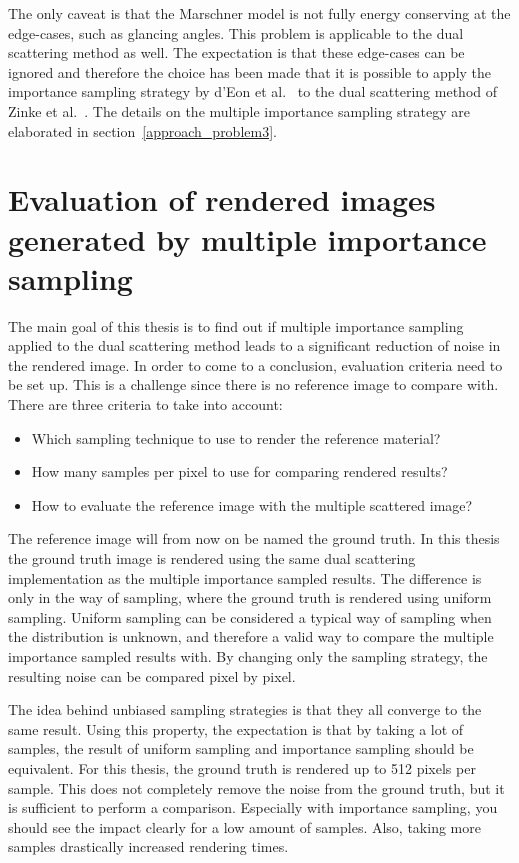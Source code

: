 \documentclass[11pt,a4paper]{report}
\begin{document}
The only caveat is that the Marschner model is not fully energy conserving at the edge-cases, such as glancing angles. This problem is applicable to the dual scattering method as well. The expectation is that these edge-cases can be ignored and therefore the choice has been made that it is possible to apply the importance sampling strategy by d'Eon et al.~\cite{eon2013} to the dual scattering method of Zinke et al.~\cite{zinke}. The details on the multiple importance sampling strategy are elaborated in section~\ref{approach_problem3}.





\section{Evaluation of rendered images generated by multiple importance sampling}
\label{approach_problem2}

The main goal of this thesis is to find out if multiple importance sampling applied to the dual scattering method leads to a significant reduction of noise in the rendered image. In order to come to a conclusion, evaluation criteria need to be set up. This is a challenge since there is no reference image to compare with. There are three criteria to take into account:

\begin{itemize}
    \item Which sampling technique to use to render the reference material?
    \item How many samples per pixel to use for comparing rendered results?
    \item How to evaluate the reference image with the multiple scattered image?
\end{itemize}

The reference image will from now on be named the ground truth. In this thesis the ground truth image is rendered using the same dual scattering implementation as the multiple importance sampled results. The difference is only in the way of sampling, where the ground truth is rendered using uniform sampling. Uniform sampling can be considered a typical way of sampling when the distribution is unknown, and therefore a valid way to compare the multiple importance sampled results with. By changing only the sampling strategy, the resulting noise can be compared pixel by pixel. 

The idea behind unbiased sampling strategies is that they all converge to the same result. Using this property, the expectation is that by taking a lot of samples, the result of uniform sampling and importance sampling should be equivalent. For this thesis, the ground truth is rendered up to 512 pixels per sample. This does not completely remove the noise from the ground truth, but it is sufficient to perform a comparison. Especially with importance sampling, you should see the impact clearly for a low amount of samples. Also, taking more samples drastically increased rendering times. 
\end{document}
